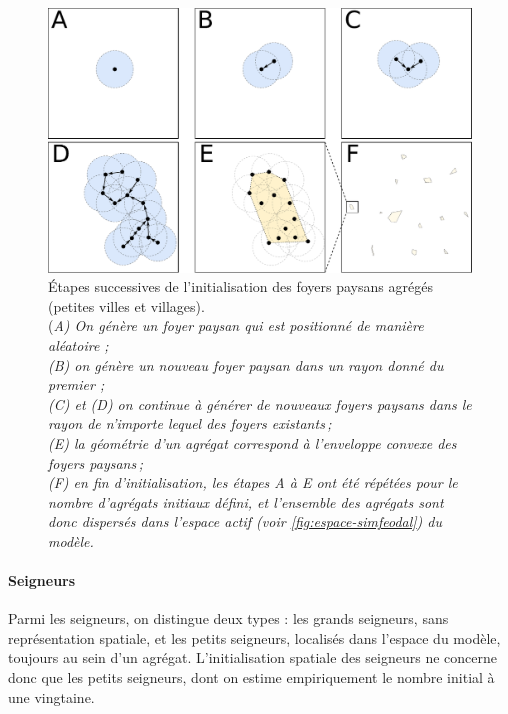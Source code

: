 \begin{figure}[H]
	\centering
	\includegraphics[width=.98\linewidth]{img/init_fp.pdf}
	\caption[Étapes successives de l'initialisation des foyers paysans agrégés (petites villes et villages).]{Étapes successives de l'initialisation des foyers paysans agrégés (petites villes et villages).\\
	(\textit{A) On génère un foyer paysan qui est positionné de manière aléatoire ;\\
	(B) on génère un nouveau foyer paysan dans un rayon donné du premier ;\\
	(C) et (D) on continue à générer de nouveaux foyers paysans dans le rayon de n'importe lequel des foyers existants ;\\
	(E) la géométrie d'un agrégat correspond à l'enveloppe convexe des foyers paysans ;\\
	(F) en fin d'initialisation, les étapes A à E ont été répétées pour le nombre d'agrégats initiaux défini, et l'ensemble des agrégats sont donc dispersés dans l'espace actif (voir \cref{fig:espace-simfeodal}) du modèle.}}
	\label{fig:init-fp}
\end{figure}


\paragraph{Seigneurs}
Parmi les seigneurs, on distingue deux types : les grands seigneurs, sans représentation spatiale, et les petits seigneurs, localisés dans l'espace du modèle, toujours au sein d'un agrégat.
L'initialisation spatiale des seigneurs ne concerne donc que les petits seigneurs, dont on estime empiriquement le nombre initial à une vingtaine.

